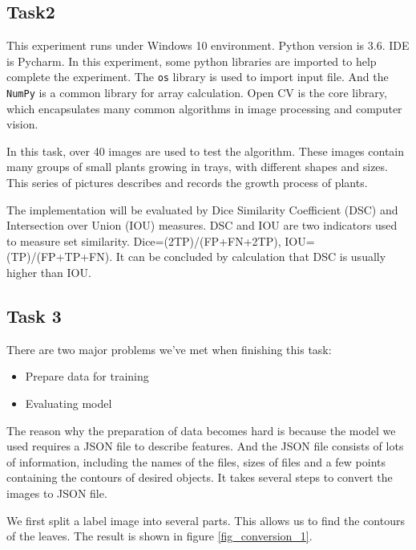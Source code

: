 \documentclass[conference]{IEEEtran}
\begin{document}
\subsection{Task2}

This experiment runs under Windows 10 environment. Python version is 3.6. IDE is Pycharm.
In this experiment, some python libraries are imported to help complete the experiment. The \verb|os| library is used to import input file. And the \verb|NumPy| is a common library for array calculation. Open CV is the core library, which encapsulates many common algorithms in image processing and computer vision. 

In this task, over 40 images are used to test the algorithm. These images contain many groups of small plants growing in trays, with different shapes and sizes. This series of pictures describes and records the growth process of plants.

The implementation will be evaluated by Dice Similarity Coefficient (DSC) and Intersection over Union (IOU) measures. DSC and IOU are two indicators used to measure set similarity. Dice=(2TP)/(FP+FN+2TP), IOU=(TP)/(FP+TP+FN). It can be concluded by calculation that DSC is usually higher than IOU.

\subsection{Task 3}

There are two major problems we've met when finishing this task: 

\begin{itemize}
\item Prepare data for training
\item Evaluating model
\end{itemize}

The reason why the preparation of data becomes hard is because the model we used requires a JSON file to describe features. And the JSON file consists of lots of information, including the names of the files, sizes of files and a few points containing the contours of desired objects. It takes several steps to convert the images to JSON file. 

We first split a label image into several parts. This allows us to find the contours of the leaves. The result is shown in figure  \ref{fig_conversion_1}.
\end{document}
